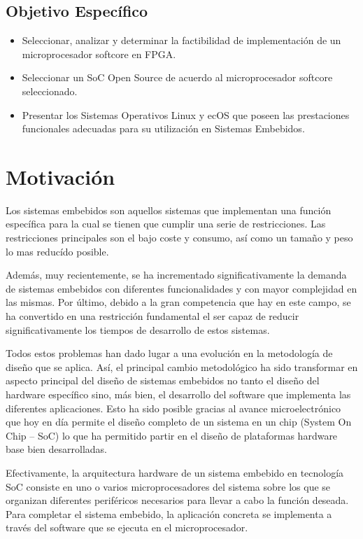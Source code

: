 \subsection{Objetivo Específico}
\begin{itemize}
\item Seleccionar, analizar y determinar la factibilidad de implementación de un microprocesador softcore en FPGA.
\item Seleccionar un SoC Open Source de acuerdo al microprocesador softcore seleccionado.
\item Presentar los Sistemas Operativos Linux y ecOS que poseen las prestaciones funcionales adecuadas para su utilización en Sistemas
Embebidos.
\end{itemize}

\section{Motivación} 
Los sistemas embebidos son aquellos sistemas que implementan una función específica para la cual se tienen que cumplir una serie de restricciones.
Las restricciones principales son el bajo coste y consumo, así como un tamaño y peso lo mas reducído posible.

Además, muy recientemente, se ha incrementado  significativamente la demanda de sistemas embebidos con diferentes funcionalidades y con mayor
complejidad  en las mismas. Por último, debido a la gran competencia  que hay en este campo, se ha convertido en una restricción fundamental el ser
capaz de reducir significativamente los tiempos de desarrollo de estos sistemas.

Todos estos problemas han dado lugar a una evolución en la metodología de diseño que se aplica. Así, el principal cambio metodológico ha sido
transformar en aspecto principal del diseño de sistemas embebidos no tanto el diseño del hardware específico sino, más bien, el desarrollo del
software que implementa las diferentes aplicaciones. Esto ha sido posible gracias al avance microelectrónico que hoy en día permite el diseño
completo de un sistema en un chip (System On Chip – SoC) lo que ha permitido partir en el diseño de plataformas hardware base bien desarrolladas.

Efectivamente, la arquitectura hardware de un sistema embebido en tecnología SoC consiste en uno o varios microprocesadores del sistema sobre los que
se organizan diferentes periféricos necesarios para llevar a cabo la función deseada. Para completar el sistema embebido, la aplicación concreta se
implementa a través del software que se ejecuta en el microprocesador.

